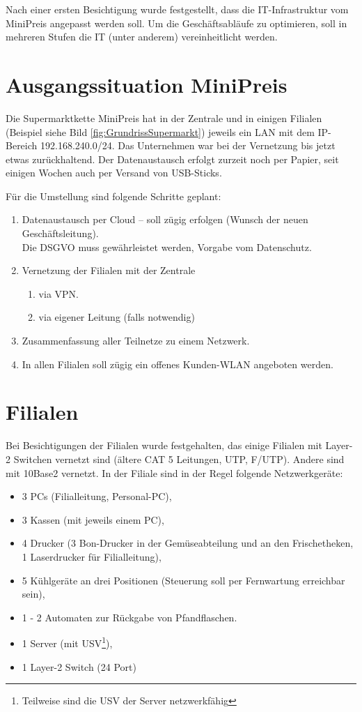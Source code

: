 \documentclass[a4paper,10pt]{scrreprt}
\begin{document}
Nach einer ersten Besichtigung wurde festgestellt, dass die IT-Infrastruktur vom MiniPreis angepasst werden soll. Um die Geschäftsabläufe zu optimieren, soll in mehreren Stufen die IT (unter anderem) vereinheitlicht werden.
\section{Ausgangssituation MiniPreis}

Die Supermarktkette MiniPreis hat in der Zentrale und in einigen Filialen (Beispiel siehe Bild \ref{fig:GrundrissSupermarkt}) jeweils ein LAN mit dem IP-Bereich 192.168.240.0/24. Das Unternehmen war bei der Vernetzung bis jetzt etwas zurückhaltend. Der Datenaustausch erfolgt zurzeit noch per Papier, seit einigen Wochen auch per Versand von USB-Sticks.

Für die Umstellung sind folgende Schritte geplant:
\begin{enumerate}
 \item Datenaustausch per Cloud – soll zügig erfolgen (Wunsch der neuen Geschäftsleitung).
 \\Die DSGVO muss gewährleistet werden, Vorgabe vom Datenschutz.
 \item Vernetzung der Filialen mit der Zentrale
 \begin{enumerate}
  \item via VPN.
  \item via eigener Leitung (falls notwendig)
 \end{enumerate}
 \item Zusammenfassung aller Teilnetze zu einem Netzwerk.
 \item In allen Filialen soll zügig ein offenes Kunden-WLAN angeboten werden.
\end{enumerate}

\section{Filialen}
Bei Besichtigungen der Filialen wurde festgehalten, das einige Filialen mit Layer-2 Switchen vernetzt sind (ältere CAT 5 Leitungen, UTP, F/UTP). Andere sind mit 10Base2 vernetzt.
\enlargethispage{\baselineskip}
In der Filiale sind in der Regel folgende Netzwerkgeräte:
\begin{itemize}
 \item 3 PCs (Filialleitung, Personal-PC),
 \item 3 Kassen (mit jeweils einem PC),
 \item 4 Drucker (3 Bon-Drucker in der Gemüseabteilung und an den Frischetheken, 1 Laserdrucker für Filialleitung),
 \item 5 Kühlgeräte an drei Positionen (Steuerung soll per Fernwartung erreichbar sein),
 \item 1 - 2 Automaten zur Rückgabe von Pfandflaschen.
 \item 1 Server (mit USV\footnote{Teilweise sind die USV der Server netzwerkfähig}),
 \item 1 Layer-2 Switch (24 Port)
\end{itemize}
\end{document}

